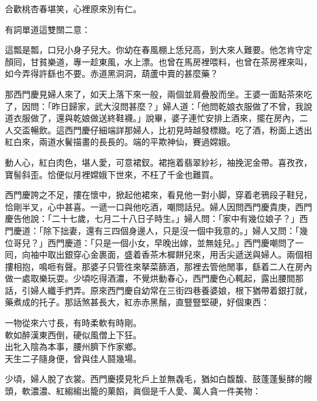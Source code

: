 \begin{myquote} 
合歡桃杏春堪笑，心裡原來別有仁。
\end{myquote} 

有詞單道這雙關二意：

\begin{myquote} 
這瓢是瓢，口兒小身子兒大。你幼在春風棚上恁兒高，到大來人難要。他怎肯守定顏囘，甘貧樂道，專一趁東風，水上漂。也曾在馬房裡喂料，也曾在茶房裡來叫，如今弄得許繇也不要。赤道黑洞洞，葫蘆中賣的甚麼藥？
\end{myquote} 

那西門慶見婦人來了，如天上落下來一般，兩個並肩疊股而坐。王婆一面點茶來吃了，因問：「昨日歸家，武大沒問甚麼？」婦人道：「他問乾娘衣服做了不曾，我說道衣服做了，還與乾娘做送終鞋襪。」說畢，婆子連忙安排上酒來，擺在房內，二人交盃暢飲。這西門慶仔細端詳那婦人，比初見時越發標緻。吃了酒，粉面上透出紅白來，兩道水鬢描畫的長長的。端的平欺神仙，賽過嫦娥。

\begin{myquote} 
動人心，紅白肉色，堪人愛，可意裙釵。裙拖着翡翠紗衫，袖挽泥金帶。喜孜孜，寶髻斜歪。恰便似月裡嫦娥下世來，不枉了千金也難買。

\end{myquote} 

西門慶誇之不足，摟在懷中，掀起他裙來，看見他一對小脚，穿着老鴉段子鞋兒，恰剛半叉，心中甚喜。一遞一口與他吃酒，嘲問話兒。婦人因問西門慶貴庚，西門慶告他說：「二十七歲，七月二十八日子時生。」婦人問：「家中有幾位娘子？」西門慶道：「除下拙妻，還有三四個身邊人，只是沒一個中我意的。」婦人又問：「幾位哥兒？」西門慶道：「只是一個小女，早晚出嫁，並無娃兒。」西門慶嘲問了一囘，向袖中取出銀穿心金裹面，盛着香茶木樨餅兒來，用舌尖遞送與婦人。兩個相摟相抱，鳴咂有聲。那婆子只管徃來拏菜篩酒，那裡去管他閒事，繇着二人在房內做一處取樂玩耍。少頃吃得酒濃，不覺烘動春心，西門慶色心輒起，露出腰間那話，引婦人纖手捫弄。原來西門慶自幼常在三街四巷養婆娘，根下猶帶着銀打就，藥煮成的托子。那話煞甚長大，紅赤赤黑鬚，直豎豎堅硬，好個東西：

\begin{myquote} 
一物從來六寸長，有時柔軟有時剛。\\軟如醉漢東西倒，硬似風僧上下狂。\\出牝入陰為本事，腰州臍下作家鄉。\\天生二子隨身便，曾與佳人鬪幾場。{}
\end{myquote} 

少頃，婦人脫了衣裳。西門慶摸見牝戶上並無毳毛，猶如白馥馥、鼓蓬蓬髮酵的饅頭，軟濃濃、紅縐縐出籠的菓餡，眞個是千人愛、萬人貪一件美物：

